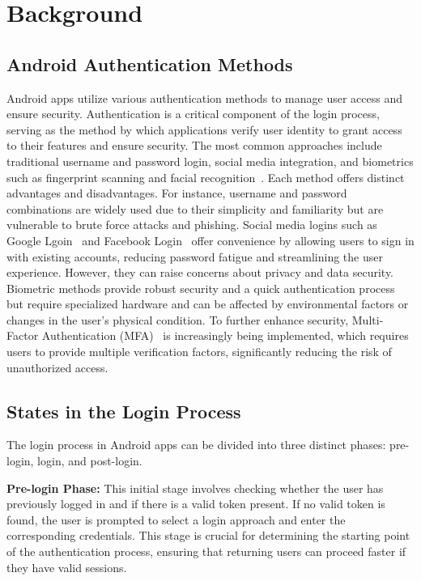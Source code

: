\section{Background}
\subsection{Android Authentication Methods}
Android apps utilize various authentication methods to manage user access and ensure security. Authentication is a critical component of the login process, serving as the method by which applications verify user identity to grant access to their features and ensure security.
The most common approaches include traditional username and password login, social media integration, and biometrics such as fingerprint scanning and facial recognition~\cite{9068715}. Each method offers distinct advantages and disadvantages. For instance, username and password combinations are widely used due to their simplicity and familiarity but are vulnerable to brute force attacks and phishing. Social media logins such as Google Lgoin~\cite{google-login-in} and Facebook Login~\cite{facebook-login-in} offer convenience by allowing users to sign in with existing accounts, reducing password fatigue and streamlining the user experience. However, they can raise concerns about privacy and data security. Biometric methods provide robust security and a quick authentication process but require specialized hardware and can be affected by environmental factors or changes in the user's physical condition. To further enhance security, Multi-Factor Authentication (MFA)~\cite{10348624} is increasingly being implemented, which requires users to provide multiple verification factors, significantly reducing the risk of unauthorized access.


\subsection{States in the Login Process}
The login process in Android apps can be divided into three distinct phases: pre-login, login, and post-login. 

\textbf{Pre-login Phase:} This initial stage involves checking whether the user has previously logged in and if there is a valid token present. If no valid token is found, the user is prompted to select a login approach and enter the corresponding credentials. This stage is crucial for determining the starting point of the authentication process, ensuring that returning users can proceed faster if they have valid sessions.

